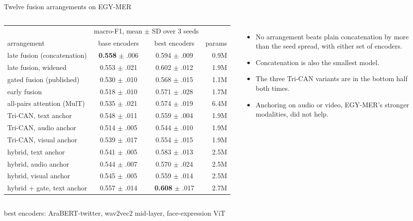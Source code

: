 \documentclass[aspectratio=169,10pt]{beamer}
\newcommand{\source}[1]{\vfill\hfill{\scriptsize\textcolor{MutedGray}{#1}}}
\begin{document}
\begin{frame}[t]{Twelve fusion arrangements on EGY-MER}
\begin{columns}[T,onlytextwidth]
\centering\scriptsize
\begin{tabular}{@{}lccr@{}}
\toprule
& \multicolumn{2}{c}{macro-F1, mean $\pm$ SD over 3 seeds} & \\
\cmidrule(lr){2-3}
arrangement & base encoders & best encoders & params \\
\midrule
late fusion (concatenation)   & \textbf{0.558} $\pm$ .006 & 0.594 $\pm$ .009 & 0.9M \\
late fusion, widened          & 0.553 $\pm$ .021 & 0.602 $\pm$ .012 & 1.9M \\
gated fusion (published)      & 0.530 $\pm$ .010 & 0.568 $\pm$ .015 & 1.1M \\
early fusion                  & 0.518 $\pm$ .010 & 0.571 $\pm$ .028 & 1.7M \\
all-pairs attention (MulT)    & 0.535 $\pm$ .021 & 0.574 $\pm$ .019 & 6.4M \\
Tri-CAN, text anchor          & 0.548 $\pm$ .011 & 0.559 $\pm$ .004 & 1.9M \\
Tri-CAN, audio anchor         & 0.514 $\pm$ .005 & 0.544 $\pm$ .010 & 1.9M \\
Tri-CAN, visual anchor        & 0.539 $\pm$ .017 & 0.554 $\pm$ .015 & 1.9M \\
hybrid, text anchor           & 0.541 $\pm$ .005 & 0.583 $\pm$ .013 & 2.5M \\
hybrid, audio anchor          & 0.544 $\pm$ .007 & 0.570 $\pm$ .024 & 2.5M \\
hybrid, visual anchor         & 0.545 $\pm$ .005 & 0.559 $\pm$ .014 & 2.5M \\
hybrid + gate, text anchor    & 0.557 $\pm$ .014 & \textbf{0.608} $\pm$ .017 & 2.7M \\
\bottomrule
\end{tabular}
\small
\begin{itemize}
\item No arrangement beats plain concatenation by more than the seed spread,
      with either set of encoders.
\item Concatenation is also the smallest model.
\item The three Tri-CAN variants are in the bottom half both times.
\item Anchoring on audio or video, EGY-MER's stronger modalities, did not help.
\end{itemize}
\end{columns}
\source{best encoders: AraBERT-twitter, wav2vec2 mid-layer, face-expression ViT}
\end{frame}
\end{document}
